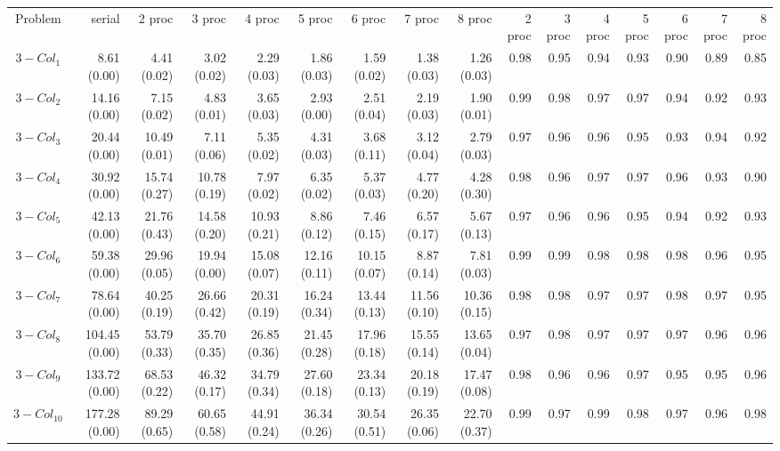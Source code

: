 \documentclass[preprint]{tlp}
\begin{document}
\begin{landscape}
\scriptsize
 
\begin{tabular}{@{\extracolsep{\fill}}|c|r|r|r|r|r|r|r|r||r|r|r|r|r|r|r|}
\cline{1-16}

Problem & serial & 2 proc  & 3 proc & 4 proc & 5 proc & 6 proc & 7 proc & 8 proc &  2 proc  & 3 proc & 4 proc & 5 proc & 6 proc & 7 proc & 8 proc\\

\cline{1-16}
$3-Col_1$ & 8.61 (0.00) &  4.41 (0.02) &  3.02 (0.02) &  2.29 (0.03) &  1.86 (0.03) &  1.59 (0.02) &  1.38 (0.03) &  1.26 (0.03) &  0.98 & 0.95 & 0.94 & 0.93 & 0.90 & 0.89 & 0.85 \\
$3-Col_2$ & 14.16 (0.00) &  7.15 (0.02) &  4.83 (0.01) &  3.65 (0.03) &  2.93 (0.00) &  2.51 (0.04) &  2.19 (0.03) &  1.90 (0.01) & 0.99 & 0.98 & 0.97 & 0.97 & 0.94 & 0.92 & 0.93 \\
$3-Col_3$ & 20.44 (0.00) &  10.49 (0.01) &  7.11 (0.06) &  5.35 (0.02) &  4.31 (0.03) &  3.68 (0.11) &  3.12 (0.04) &  2.79 (0.03) & 0.97 & 0.96 & 0.96 & 0.95 & 0.93 & 0.94 & 0.92 \\
$3-Col_4$ & 30.92 (0.00) &  15.74 (0.27) &  10.78 (0.19) &  7.97 (0.02) &  6.35 (0.02) &  5.37 (0.03) &  4.77 (0.20) &  4.28 (0.30) & 0.98 & 0.96 & 0.97 & 0.97 & 0.96 & 0.93 & 0.90 \\
$3-Col_5$ & 42.13 (0.00) &  21.76 (0.43) &  14.58 (0.20) &  10.93 (0.21) &  8.86 (0.12) &  7.46 (0.15) &  6.57 (0.17) &  5.67 (0.13) & 0.97 & 0.96 & 0.96 & 0.95 & 0.94 & 0.92 & 0.93 \\
$3-Col_6$ & 59.38 (0.00) &  29.96 (0.05) &  19.94 (0.00) &  15.08 (0.07) &  12.16 (0.11) &  10.15 (0.07) &  8.87 (0.14) &  7.81 (0.03) & 0.99 & 0.99 & 0.98 & 0.98 & 0.98 & 0.96 & 0.95 \\
$3-Col_7$ & 78.64 (0.00) &  40.25 (0.19) &  26.66 (0.42) &  20.31 (0.19) &  16.24 (0.34) &  13.44 (0.13) &  11.56 (0.10) &  10.36 (0.15) & 0.98 & 0.98 & 0.97 & 0.97 & 0.98 & 0.97 & 0.95 \\
$3-Col_8$ & 104.45 (0.00) &  53.79 (0.33) &  35.70 (0.35) &  26.85 (0.36) &  21.45 (0.28) &  17.96 (0.18) &  15.55 (0.14) &  13.65 (0.04) & 0.97 & 0.98 & 0.97 & 0.97 & 0.97 & 0.96 & 0.96 \\
$3-Col_9$ & 133.72 (0.00) &  68.53 (0.22) &  46.32 (0.17) &  34.79 (0.34) &  27.60 (0.18) &  23.34 (0.13) &  20.18 (0.19) &  17.47 (0.08) & 0.98 & 0.96 & 0.96 & 0.97 & 0.95 & 0.95 & 0.96 \\
$3-Col_{10}$ & 177.28 (0.00) &  89.29 (0.65) &  60.65 (0.58) &  44.91 (0.24) &  36.34 (0.26) &  30.54 (0.51) &  26.35 (0.06) &  22.70 (0.37) & 0.99 & 0.97 & 0.99 & 0.98 & 0.97 & 0.96 & 0.98 \\

\end{tabular}
\end{landscape}
\end{document}
